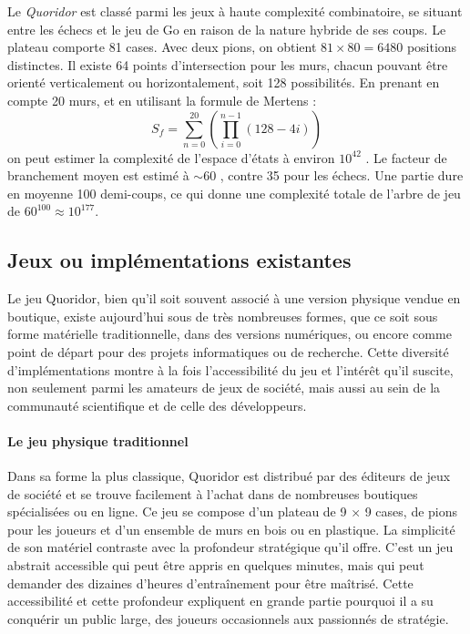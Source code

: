 \documentclass[a4paper]{article}
\begin{document}
Le \emph{Quoridor} est classé parmi les jeux à haute complexité combinatoire, se situant entre les échecs et le jeu de Go en raison de la nature hybride de ses coups. Le plateau comporte 81 cases. Avec deux pions, on obtient $81 \times 80 = 6480$ positions distinctes. Il existe 64 points d'intersection pour les murs, chacun pouvant être orienté verticalement ou horizontalement, soit 128 possibilités. En prenant en compte 20 murs, et en utilisant la formule de Mertens :
\begin{equation}
S_f = \sum_{n=0}^{20} \left( \prod_{i=0}^{n-1} (128 - 4i) \right)
\end{equation}
on peut estimer la complexité de l'espace d'états à environ $10^{42}$ \cite{mertens2006}. Le facteur de branchement moyen est estimé à $\sim 60$ \cite{Glendenning2002MasteringQ}, contre 35 pour les échecs. Une partie dure en moyenne 100 demi-coups, ce qui donne une complexité totale de l'arbre de jeu de $60^{100} \approx 10^{177}$.

\subsection{Jeux ou implémentations existantes}

Le jeu Quoridor, bien qu’il soit souvent associé à une version physique vendue en boutique, existe aujourd’hui sous de très nombreuses formes, que ce soit sous forme matérielle traditionnelle, dans des versions numériques, ou encore comme point de départ pour des projets informatiques ou de recherche. Cette diversité d’implémentations montre à la fois l’accessibilité du jeu et l’intérêt qu’il suscite, non seulement parmi les amateurs de jeux de société, mais aussi au sein de la communauté scientifique et de celle des développeurs.

\paragraph{Le jeu physique traditionnel}

Dans sa forme la plus classique, Quoridor est distribué par des éditeurs de jeux de société et se trouve facilement à l’achat dans de nombreuses boutiques spécialisées ou en ligne. Ce jeu se compose d’un plateau de 9 × 9 cases, de pions pour les joueurs et d’un ensemble de murs en bois ou en plastique. La simplicité de son matériel contraste avec la profondeur stratégique qu’il offre. C’est un jeu abstrait accessible qui peut être appris en quelques minutes, mais qui peut demander des dizaines d’heures d’entraînement pour être maîtrisé. Cette accessibilité et cette profondeur expliquent en grande partie pourquoi il a su conquérir un public large, des joueurs occasionnels aux passionnés de stratégie.
\end{document}
